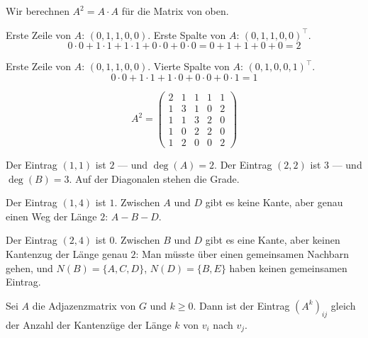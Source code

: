 \begin{merksatz}
Wir berechnen $A^2 = A \cdot A$ für die Matrix von oben.

Erste Zeile von $A$: $(0,1,1,0,0)$. Erste Spalte von $A$: $(0,1,1,0,0)^{\!\top}$.
\[ 0\cdot 0 + 1\cdot 1 + 1\cdot 1 + 0\cdot 0 + 0\cdot 0 = 0 + 1 + 1 + 0 + 0 = 2 \]

Erste Zeile von $A$: $(0,1,1,0,0)$. Vierte Spalte von $A$: $(0,1,0,0,1)^{\!\top}$.
\[ 0\cdot 0 + 1\cdot 1 + 1\cdot 0 + 0\cdot 0 + 0\cdot 1 = 1 \]

\[ A^2 = \begin{pmatrix}
2 & 1 & 1 & 1 & 1 \\
1 & 3 & 1 & 0 & 2 \\
1 & 1 & 3 & 2 & 0 \\
1 & 0 & 2 & 2 & 0 \\
1 & 2 & 0 & 0 & 2
\end{pmatrix} \]

Der Eintrag $(1,1)$ ist $2$ --- und $\deg(A) = 2$. Der Eintrag $(2,2)$ ist $3$ --- und $\deg(B) = 3$. Auf der Diagonalen stehen die Grade.

Der Eintrag $(1,4)$ ist $1$. Zwischen $A$ und $D$ gibt es keine Kante, aber genau einen Weg der Länge $2$: $A - B - D$.

Der Eintrag $(2,4)$ ist $0$. Zwischen $B$ und $D$ gibt es eine Kante, aber keinen Kantenzug der Länge genau $2$: Man müsste über einen gemeinsamen Nachbarn gehen, und $N(B) = \{A,C,D\}$, $N(D) = \{B,E\}$ haben keinen gemeinsamen Eintrag.
\end{merksatz}

\begin{merksatz}
Sei $A$ die Adjazenzmatrix von $G$ und $k \ge 0$. Dann ist der Eintrag $(A^k)_{ij}$ gleich der Anzahl der Kantenzüge der Länge $k$ von $v_i$ nach $v_j$.
\end{merksatz}

